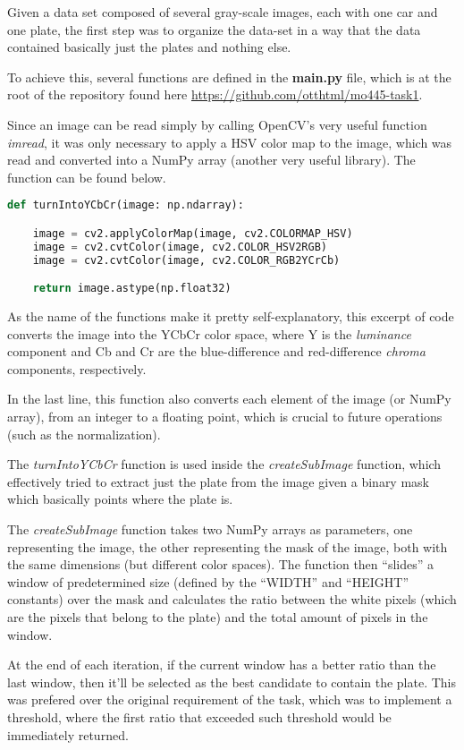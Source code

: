 \documentclass[11pt]{IEEEtran}
\begin{document}
Given a data set composed of several gray-scale images, each with one car and one plate, the first step was to organize the data-set in a way that the data contained basically just the plates and nothing else.

To achieve this, several functions are defined in the \textbf{main.py} file, which is at the root of the repository found here
\url{https://github.com/otthtml/mo445-task1}.

Since an image can be read simply by calling OpenCV's very useful function \textit{imread}, it was only necessary to apply a HSV color map to the image, which was read and converted into a NumPy array (another very useful library). The function can be found below.

\begin{lstlisting}[language=Python]
def turnIntoYCbCr(image: np.ndarray):

    image = cv2.applyColorMap(image, cv2.COLORMAP_HSV)
    image = cv2.cvtColor(image, cv2.COLOR_HSV2RGB)
    image = cv2.cvtColor(image, cv2.COLOR_RGB2YCrCb)

    return image.astype(np.float32)
\end{lstlisting}

As the name of the functions make it pretty self-explanatory, this excerpt of code converts the image into the YCbCr color space, where Y is the \textit{luminance} component and Cb and Cr are the blue-difference and red-difference \textit{chroma} components, respectively.

In the last line, this function also converts each element of the image (or NumPy array), from an integer to a floating point, which is crucial to future operations (such as the normalization).

The \textit{turnIntoYCbCr} function is used inside the \textit{createSubImage} function, which effectively tried to extract just the plate from the image given a binary mask which basically points where the plate is. 

The \textit{createSubImage} function takes two NumPy arrays as parameters, one representing the image, the other representing the mask of the image, both with the same dimensions (but different color spaces). The function then ``slides'' a window of predetermined size (defined by the ``WIDTH'' and ``HEIGHT'' constants) over the mask and calculates the ratio between the white pixels (which are the pixels that belong to the plate) and the total amount of pixels in the window.

At the end of each iteration, if the current window has a better ratio than the last window, then it'll be selected as the best candidate to contain the plate. This was prefered over the original requirement of the task, which was to implement a threshold, where the first ratio that exceeded such threshold would be immediately returned.
\end{document}
